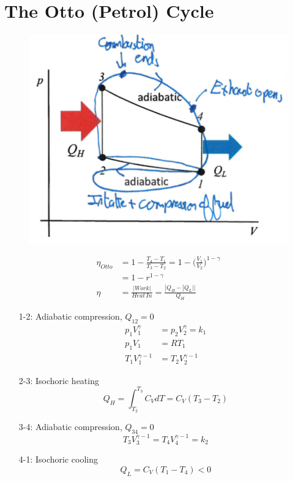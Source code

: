 \documentclass[a4paper, 11pt, normalem]{report}
\begin{document}
\section{The Otto (Petrol) Cycle}
\begin{figure}
    \begin{center}
        \includegraphics[scale=0.2]{Otto.png}
        \vspace{-200pt}
    \end{center}
\end{figure}
\begin{align*}
    \eta_{Otto} &= 1 - \frac{T_4 - T_1}{T_3 - T_2} = 1 - \Big(\frac{V_1}{V_2}\Big)^{1 - \gamma} \\
    &= 1 - r^{1 - \gamma} \\
    \eta &= \frac{|Work|}{Heat\,In} = \frac{|Q_H - |Q_L||}{Q_H}
\end{align*}
\begin{itemize}
    \item[1-2:] Adiabatic compression, $Q_{12} = 0$
                \begin{align*}
                    p_1 V_{1}^\gamma &= p_2 V_{2}^\gamma = k_1 \\
                    p_1 V_{1} &= RT_1 \\
                    T_1 V_{1}^{\gamma - 1} &= T_2 V_{2}^{\gamma - 1}
                \end{align*}
    \item[2-3:]  Isochoric heating
                \begin{equation*}
                    Q_H = \int_{T_2}^{T_3} C_V dT = C_V (T_3 - T_2)
                \end{equation*}
    \item[3-4:] Adiabatic compression, $Q_{34} = 0$
                \begin{equation*}
                    T_3 V_{3}^{\gamma - 1} = T_4 V_{4}^{\gamma - 1} = k_2
                \end{equation*}
    \item[4-1:] Isochoric cooling
                \begin{equation*}
                    Q_L = C_V (T_1 - T_4) < 0
                \end{equation*}
\end{itemize}
\end{document}
